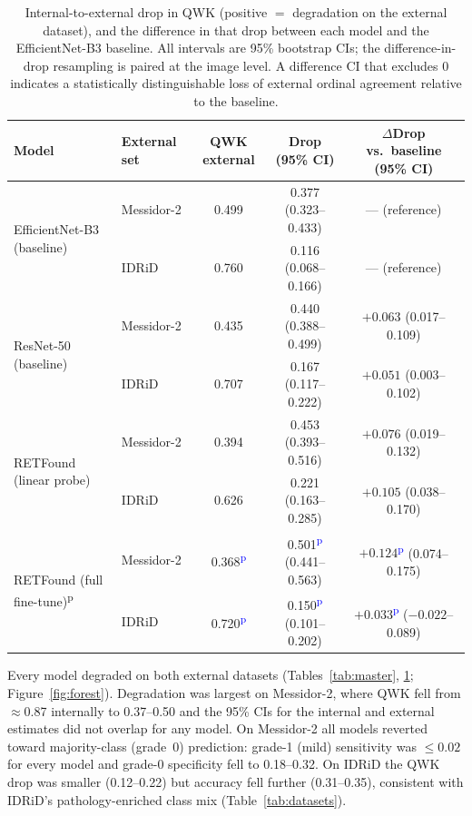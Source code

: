 \documentclass[11pt,a4paper]{article}
\newcommand{\prov}[1]{#1\textsuperscript{\textcolor{blue}{p}}} %
\begin{document}
\begin{table}[t]
\centering
\caption{Internal-to-external drop in QWK (positive $=$ degradation on the
external dataset), and the difference in that drop between each model and the
EfficientNet-B3 baseline. All intervals are 95\% bootstrap CIs; the
difference-in-drop resampling is paired at the image level. A difference CI that
excludes 0 indicates a statistically distinguishable loss of external ordinal
agreement relative to the baseline.}
\label{tab:drop}
\footnotesize
\setlength{\tabcolsep}{4pt}
\begin{tabular}{llccc}
\toprule
Model & External set & QWK external & Drop (95\% CI) & $\Delta$Drop vs.\ baseline (95\% CI) \\
\midrule
\multirow{2}{*}{EfficientNet-B3 (baseline)}
 & Messidor-2 & 0.499 & 0.377 (0.323--0.433) & --- (reference) \\
 & IDRiD      & 0.760 & 0.116 (0.068--0.166) & --- (reference) \\
\midrule
\multirow{2}{*}{ResNet-50 (baseline)}
 & Messidor-2 & 0.435 & 0.440 (0.388--0.499) & $+0.063$ (0.017--0.109) \\
 & IDRiD      & 0.707 & 0.167 (0.117--0.222) & $+0.051$ (0.003--0.102) \\
\midrule
\multirow{2}{*}{RETFound (linear probe)}
 & Messidor-2 & 0.394 & 0.453 (0.393--0.516) & $+0.076$ (0.019--0.132) \\
 & IDRiD      & 0.626 & 0.221 (0.163--0.285) & $+0.105$ (0.038--0.170) \\
\midrule
\multirow{2}{*}{RETFound (full fine-tune)\textsuperscript{p}}
 & Messidor-2 & \prov{0.368} & \prov{0.501} (0.441--0.563) & \prov{$+0.124$} (0.074--0.175) \\
 & IDRiD      & \prov{0.720} & \prov{0.150} (0.101--0.202) & \prov{$+0.033$} ($-0.022$--0.089) \\
\bottomrule
\end{tabular}
\end{table}

Every model degraded on both external datasets (Tables~\ref{tab:master},
\ref{tab:drop}; Figure~\ref{fig:forest}). Degradation was largest on Messidor-2,
where QWK fell from $\approx$\num{0.87} internally to \numrange{0.37}{0.50} and
the 95\% CIs for the internal and external estimates did not overlap for any
model. On Messidor-2 all models reverted toward majority-class (grade~0)
prediction: grade-1 (mild) sensitivity was $\le \num{0.02}$ for every model and
grade-0 specificity fell to \numrange{0.18}{0.32}. On IDRiD the QWK drop was
smaller (\numrange{0.12}{0.22}) but accuracy fell further
(\numrange{0.31}{0.35}), consistent with IDRiD's pathology-enriched class mix
(Table~\ref{tab:datasets}).
\end{document}
